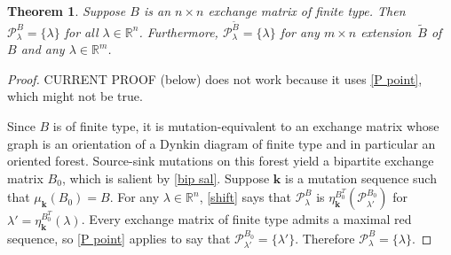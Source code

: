\documentclass{amsart}
\newtheorem{theorem}[proposition]{Theorem}
\theoremstyle{definition}
\theoremstyle{remark}
\numberwithin{equation}{section}
\newcommand{\reals}{\mathbb R}
\newcommand{\edge}{\,\,\rule[2.7pt]{20pt}{0.5pt}\,\,}
\newcommand{\set}[1]{{\lbrace #1 \rbrace}}
\newcommand{\0}{{\mathbf{0}}}
\newcommand{\Cone}{\mathrm{Cone}}
\newcommand{\kk}{{\boldsymbol{k}}}
\renewcommand{\ll}{{\boldsymbol\ell}}
\newcommand{\tB}{{\tilde{B}}}
\newcommand{\BB}{\mathbf{B}}
\renewcommand{\P}{\mathcal{P}}
\begin{document}
\begin{theorem}\label{finite P point}  
Suppose $B$ is an $n\times n$ exchange matrix of finite type.
Then $\P^B_\lambda=\set{\lambda}$ for all $\lambda\in\reals^n$.
Furthermore, $\P^\tB_\lambda=\set{\lambda}$ for any $m\times n$ extension~$\tB$ of $B$ and any $\lambda\in\reals^m$.
\end{theorem}
\begin{proof}
%
%
%

CURRENT PROOF (below) does not work because it uses \cref{P point}, which might not be true.

Since $B$ is of finite type, it is mutation-equivalent to an exchange matrix whose graph is an orientation of a Dynkin diagram of finite type and in particular an oriented forest.
Source-sink mutations on this forest yield a bipartite exchange matrix $B_0$, which is salient by \cref{bip sal}.
Suppose $\kk$ is a mutation sequence such that $\mu_\kk(B_0)=B$.
For any $\lambda\in\reals^n$, \cref{shift} says that $\P_\lambda^B$ is $\eta_\kk^{B_0^T}(\P_{\lambda'}^{B_0})$ for $\lambda'=\eta_\kk^{B_0^T}(\lambda)$.
Every exchange matrix of finite type admits a maximal red sequence, so \cref{P point} applies to say that $\P_{\lambda'}^{B_0}=\set{\lambda'}$.
Therefore $\P_\lambda^B=\set{\lambda}$.


\end{proof}
\end{document}
